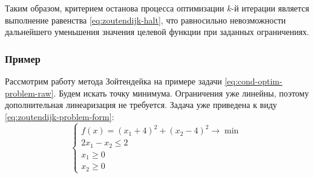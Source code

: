 Таким образом, критерием останова процесса оптимизации $k$-й итерации
является выполнение равенства \eqref{eq:zoutendijk-halt}, что
равносильно невозможности дальнейшего уменьшения значения целевой
функции при заданных ограничениях.

\subsubsection{Пример}

Рассмотрим работу метода Зойтендейка на примере задачи
\eqref{eq:cond-optim-problem-raw}. Будем искать точку минимума.
Ограничения уже линейны, поэтому дополнительная линеаризация не
требуется. Задача уже приведена к виду
\eqref{eq:zoutendijk-problem-form}:
\begin{equation}
  \label{eq:zoutendijk-problem}
  \begin{cases}
    f(x) = (x_1+4)^2 + (x_2-4)^2 \to \min \\
    2x_1-x_2 \leq 2 \\
    x_1 \geq 0 \\
    x_2 \geq 0
  \end{cases}
\end{equation}

